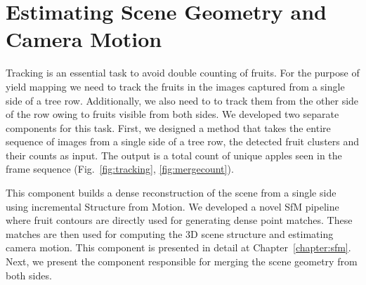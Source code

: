 \section{Estimating Scene Geometry and Camera Motion}\label{subsec:syscammotion}

Tracking is an essential task to avoid double counting of fruits. For the purpose of yield mapping we need to track the fruits in the images captured from a single side of a tree row. Additionally, we also need to to track them from the other side of the row owing to fruits visible from both sides. We developed two separate components for this task. First, we designed a method that takes the entire sequence of images from a single side of a tree row, the detected fruit clusters and their counts as input. The output is a total count of unique apples seen in the frame sequence (Fig.~\ref{fig:tracking}, \ref{fig:mergecount}).

This component builds a dense reconstruction of the scene from a single side using incremental Structure from Motion. We developed a novel SfM pipeline where fruit contours are directly used for generating dense point matches. These matches are then used for computing the 3D scene structure and estimating camera motion. This component is presented in detail at Chapter~\ref{chapter:sfm}. Next, we present the component responsible for merging the scene geometry from both sides.

